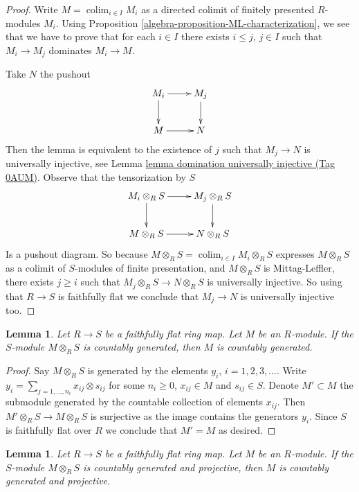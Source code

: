 \documentclass{amsart}
\theoremstyle{plain}
\newtheorem{lemma}[subsection]{Lemma}
\theoremstyle{definition}
\theoremstyle{remark}
\numberwithin{equation}{subsection}
\def\colim{\mathop{\mathrm{colim}}\nolimits}
\begin{document}
\begin{proof}
Write $M = \colim_{i\in I} M_i$ as a directed colimit
of finitely presented $R$-modules $M_i$.
Using Proposition \ref{algebra-proposition-ML-characterization}, we see that we
have to prove that for each $i \in I$ there exists $i \leq j$, $j\in I$
such that $M_i\rightarrow M_j$ dominates $M_i\rightarrow M$.

\medskip\noindent
Take $N$ the pushout
$$
\xymatrix{
M_i  \ar[r] \ar[d] & M_j \ar[d] \\
M \ar[r] & N
}
$$
Then the lemma is equivalent to the existence of $j$ such that
$M_j\rightarrow N$ is universally injective, see
Lemma \href{https://stacks.math.columbia.edu/tag/0AUM}{lemma domination universally injective (Tag 0AUM)}.
Observe that the tensorization by $S$
$$
\xymatrix{
M_i\otimes_R S  \ar[r] \ar[d] & M_j\otimes_R S \ar[d] \\
M\otimes_R S \ar[r] & N\otimes_R S
}
$$
Is a pushout diagram.  So because
$M \otimes_R S = \colim_{i\in I} M_i \otimes_R S$
expresses $M\otimes_R S$ as a colimit of $S$-modules of
finite presentation, and $M\otimes_R S$ is Mittag-Leffler,
there exists $j \geq i$ such that $M_j\otimes_R S\rightarrow N\otimes_R S$
is universally injective. So using that $R\rightarrow S$ is faithfully flat
we conclude that $M_j\rightarrow N$ is universally injective too.
\end{proof}


\begin{lemma}
\label{algebra-lemma-ffdescent-countable}
Let $R \to S$ be a faithfully flat ring map. Let $M$ be an $R$-module. If
the $S$-module $M \otimes_R S$ is countably generated, then $M$
is countably generated.
\end{lemma}

\begin{proof}
Say $M \otimes_R S$ is generated by the elements
$y_i$, $i = 1, 2, 3, \ldots$. Write $y_i = \sum_{j = 1, \ldots, n_i}
x_{ij} \otimes s_{ij}$ for some $n_i \geq 0$, $x_{ij} \in M$
and $s_{ij} \in S$. Denote $M' \subset M$ the submodule generated
by the countable collection of elements $x_{ij}$. Then
$M' \otimes_R S \to M \otimes_R S$ is surjective as the
image contains the generators $y_i$. Since $S$ is faithfully flat
over $R$ we conclude that $M' = M$ as desired.
\end{proof}


\begin{lemma}
\label{algebra-lemma-ffdescent-countable-projectivity}
Let $R \to S$ be a faithfully flat ring map.  Let $M$ be an $R$-module.
 If the $S$-module $M \otimes_R S$ is countably generated and projective,
then $M$ is countably generated and projective.
\end{lemma}
\end{document}

